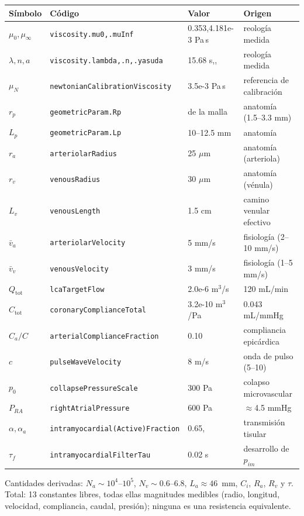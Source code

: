 \documentclass[11pt]{article}
\begin{document}
\begin{center}\small
\begin{tabular}{llll}
\toprule
S\'imbolo & C\'odigo & Valor & Origen\\
\midrule
$\mu_0,\mu_\infty$ & \texttt{viscosity.mu0,.muInf} & 0.353,\;4.181e-3 Pa\,s & reolog\'ia medida\\
$\lambda,n,a$ & \texttt{viscosity.lambda,.n,.yasuda} & 15.68 s,\;0.205,\;0.650 & reolog\'ia medida\\
$\mu_N$ & \texttt{newtonianCalibrationViscosity} & 3.5e-3 Pa\,s & referencia de calibraci\'on\\
\midrule
$r_p$ & \texttt{geometricParam.Rp} & de la malla & anatom\'ia (1.5--3.3 mm)\\
$L_p$ & \texttt{geometricParam.Lp} & 10--12.5 mm & anatom\'ia\\
$r_a$ & \texttt{arteriolarRadius} & 25 $\mu$m & anatom\'ia (arteriola)\\
$r_v$ & \texttt{venousRadius} & 30 $\mu$m & anatom\'ia (v\'enula)\\
$L_v$ & \texttt{venousLength} & 1.5 cm & camino venular efectivo\\
$\bar v_a$ & \texttt{arteriolarVelocity} & 5 mm/s & fisiolog\'ia (2--10 mm/s)\\
$\bar v_v$ & \texttt{venousVelocity} & 3 mm/s & fisiolog\'ia (1--5 mm/s)\\
$Q_{\text{tot}}$ & \texttt{lcaTargetFlow} & 2.0e-6 m$^3$/s & 120 mL/min\\
$C_{\text{tot}}$ & \texttt{coronaryComplianceTotal} & 3.2e-10 m$^3$/Pa & 0.043 mL/mmHg\\
$C_a/C$ & \texttt{arterialComplianceFraction} & 0.10 & compliancia epic\'ardica\\
$c$ & \texttt{pulseWaveVelocity} & 8 m/s & onda de pulso (5--10)\\
$p_0$ & \texttt{collapsePressureScale} & 300 Pa & colapso microvascular\\
$P_{RA}$ & \texttt{rightAtrialPressure} & 600 Pa & $\approx$4.5 mmHg\\
$\alpha,\alpha_a$ & \texttt{intramyocardial(Active)Fraction} & 0.65,\;0.01 & transmisi\'on tisular\\
$\tau_f$ & \texttt{intramyocardialFilterTau} & 0.02 s & desarrollo de $p_{im}$\\
\bottomrule
\end{tabular}
\end{center}

\noindent
Cantidades derivadas: $N_a\!\sim\!10^{4}$--$10^{5}$, $N_v\!\sim\!0.6$--$6.8$,
$L_a\!\approx\!46$~mm, $C_i$, $R_a$, $R_v$ y $\tau$. Total: 13 constantes
libres, todas ellas magnitudes medibles (radio, longitud, velocidad,
compliancia, caudal, presi\'on); ninguna es una resistencia equivalente.
\end{document}
